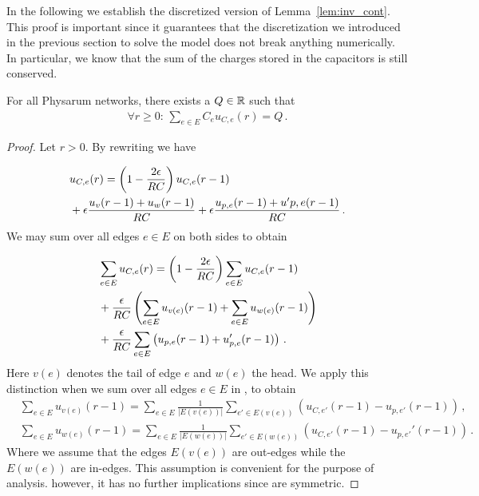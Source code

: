 In the following we establish the discretized version of Lemma~\ref{lem:inv_cont}. This proof is important since it guarantees that the discretization we introduced in the previous section to solve the model does not break anything numerically. In particular, we know that the sum of the charges stored in the capacitors is still conserved.

\begin{lem}\label{cor:inv_disc}
For all Physarum networks, there exists a $Q \in \mathbb{R}$ such that
\begin{align}
\forall r \ge 0:\,\sum_{e \in E}C_e u_{C,e}(r) = Q\,.
\end{align}
\end{lem}

\begin{proof}
Let $r > 0$. By rewriting  we have

\begin{align}
&u_{C,e}(r) = \left( 1 - \frac{2 \epsilon}{RC}\right) u_{C,e}(r - 1)  \\\notag
&+\epsilon \frac{u_v(r - 1) + u_w(r-1)}{RC} + \epsilon \frac{u_{p,e}(r-1) + u'{p,e}(r - 1)}{RC}\,.
\end{align}
We may sum over all edges $e \in E$ on both sides to obtain

\begin{align}\label{eq:key}
&\sum_{e\in E} u_{C,e}(r) = \left( 1 - \frac{2 \epsilon}{RC}\right) \sum_{e\in E} u_{C,e}(r - 1)  \\\notag
&+ \frac{\epsilon}{RC}\left( \sum_{e\in E} u_{v(e)}(r - 1) + \sum_{e\in E} u_{w(e)}(r-1) \right) \\\notag
&+ \frac{\epsilon}{RC} \sum_{e\in E} \left(u_{p,e}(r-1) + u'_{p,e}(r - 1)\right)\,.
\end{align}
Here $v(e)$ denotes the tail of edge $e$ and $w(e)$ the head. We apply this distinction when we sum over all edges $e \in E$ in , to obtain
\begin{align}
&\sum_{e \in E} u_{v(e)}(r-1) = \sum_{e \in E}\frac{1}{|E(v(e))|}\sum_{e' \in E(v(e))}(u_{C,e'}(r-1)-u_{p,e'}(r-1))\,,\label{eq:dis:u:v1}\\
&\sum_{e \in E} u_{w(e)}(r-1) = \sum_{e \in E}\frac{1}{|E(w(e))|}\sum_{e' \in E(w(e))}(u_{C,e'}(r-1)-u_{p,e'}'(r-1))\,.\label{eq:dis:u:w1}
\end{align}
Where we assume that the edges $E(v(e))$ are out-edges while the $E(w(e))$ are in-edges. This assumption is convenient for the purpose of analysis. however, it has no further implications since \Pes are symmetric. 


\end{proof}

